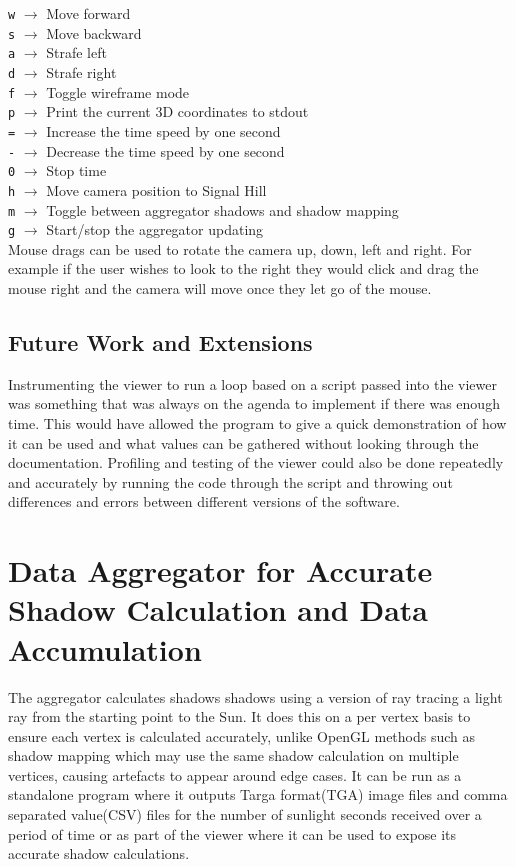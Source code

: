\documentclass[12pt]{report}
\begin{document}
\texttt{w} $\rightarrow$ Move forward\\
\texttt{s} $\rightarrow$ Move backward\\
\texttt{a} $\rightarrow$ Strafe left\\
\texttt{d} $\rightarrow$ Strafe right\\
\texttt{f} $\rightarrow$ Toggle wireframe mode\\
\texttt{p} $\rightarrow$ Print the current 3D coordinates to stdout\\
\texttt{=} $\rightarrow$ Increase the time speed by one second\\
\texttt{-} $\rightarrow$ Decrease the time speed by one second\\
\texttt{0} $\rightarrow$ Stop time\\
\texttt{h} $\rightarrow$ Move camera position to Signal Hill\\
\texttt{m} $\rightarrow$ Toggle between aggregator shadows and shadow mapping\\
\texttt{g} $\rightarrow$ Start/stop the aggregator updating\\

Mouse drags can be used to rotate the camera up, down, left and right. For example if the user wishes to look to the right they would click and drag the mouse right and the camera will move once they let go of the mouse.

\section{Future Work and Extensions}
Instrumenting the viewer to run a loop based on a script passed into the viewer was something that was always on the agenda to implement if there was enough time. This would have allowed the program to give a quick demonstration of how it can be used and what values can be gathered without looking through the documentation. Profiling and testing of the viewer could also be done repeatedly and accurately by running the code through the script and throwing out differences and errors between different versions of the software.

\chapter{Data Aggregator for Accurate Shadow Calculation and Data Accumulation}
The aggregator calculates shadows shadows using a version of ray tracing a light ray from the starting point to the Sun. It does this on a per vertex basis to ensure each vertex is calculated accurately, unlike OpenGL methods such as shadow mapping which may use the same shadow calculation on multiple vertices, causing artefacts to appear around edge cases. It can be run as a standalone program where it outputs Targa format(TGA) image files and comma separated value(CSV) files for the number of sunlight seconds received over a period of time or as part of the viewer where it can be used to expose its accurate shadow calculations.
\end{document}
